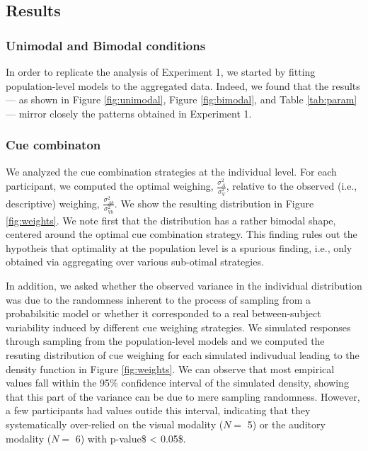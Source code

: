 \documentclass[english,,man,floatsintext]{apa6}
\theoremstyle{definition}
\theoremstyle{definition}
\theoremstyle{definition}
\theoremstyle{remark}
\begin{document}
\subsection{Results}\label{results-2}

\subsubsection{Unimodal and Bimodal
conditions}\label{unimodal-and-bimodal-conditions}

In order to replicate the analysis of Experiment 1, we started by
fitting population-level models to the aggregated data. Indeed, we found
that the results --- as shown in Figure \ref{fig:unimodal}, Figure
\ref{fig:bimodal}, and Table \ref{tab:param} --- mirror closely the
patterns obtained in Experiment 1.

\subsubsection{Cue combinaton}\label{cue-combinaton}

We analyzed the cue combination strategies at the individual level. For
each participant, we computed the optimal weighing,
\(\frac{\sigma^2_{A}}{\sigma^2_{V}}\), relative to the observed (i.e.,
descriptive) weighing, \(\frac{\sigma^2_{Ab}}{\sigma^2_{Vb}}\). We show
the resulting distribution in Figure \ref{fig:weights}. We note first
that the distribution has a rather bimodal shape, centered around the
optimal cue combination strategy. This finding rules out the hypotheis
that optimality at the population level is a spurious finding, i.e.,
only obtained via aggregating over various sub-otimal strategies.

In addition, we asked whether the observed variance in the individual
distribution was due to the randomness inherent to the process of
sampling from a probabilsitic model or whether it corresponded to a real
between-subject variability induced by different cue weighing
strategies. We simulated responses through sampling from the
population-level models and we computed the resuting distribution of cue
weighing for each simulated indivudual leading to the density function
in Figure \ref{fig:weights}. We can observe that most empirical values
fall within the 95\% confidence interval of the simulated density,
showing that this part of the variance can be due to mere sampling
randomness. However, a few participants had values outide this interval,
indicating that they systematically over-relied on the visual modality
(\(N=\) 5) or the auditory modality (\(N=\) 6) with p-value\$
\textless{} 0.05\$.
\end{document}
